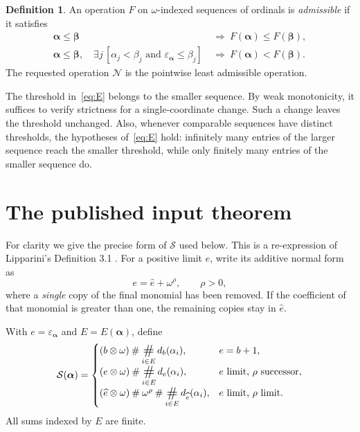 \documentclass[11pt,letterpaper]{article}
\theoremstyle{definition}
\newtheorem{definition}[theorem]{Definition}
\theoremstyle{remark}
\newcommand{\Nop}{\mathcal N}
\newcommand{\Sop}{\mathcal S}
\newcommand{\seq}[1]{\boldsymbol{#1}}
\newcommand{\ns}{\mathbin{\#}}
\newcommand{\np}{\mathbin{\otimes}}
\newcommand{\NS}{\mathop{\mathchoice{\vcenter{\hbox{\Large\#}}}{\vcenter{\hbox{\large\#}}}{\#}{\#}}}
\newcommand{\epsa}{\varepsilon_{\seq\alpha}}
\newcommand{\diff}[2]{d_{#1}(#2)}
\begin{document}
\begin{definition}\label{def:admissible}
An operation $F$ on $\omega$-indexed sequences of ordinals is \emph{admissible} if it satisfies
\begin{align}
 \seq\alpha\le\seq\beta&\ \Longrightarrow\ F(\seq\alpha)\le F(\seq\beta),\tag{M}\label{eq:M}\\
 \seq\alpha\le\seq\beta,\quad
 \exists j\,[\alpha_j<\beta_j\text{ and }\epsa\le\beta_j]
 &\ \Longrightarrow\ F(\seq\alpha)<F(\seq\beta).\tag{E}\label{eq:E}
\end{align}
The requested operation $\Nop$ is the pointwise least admissible operation.
\end{definition}

The threshold in~\eqref{eq:E} belongs to the smaller sequence. By weak monotonicity, it suffices to verify strictness for a single-coordinate change. Such a change leaves the threshold unchanged. Also, whenever comparable sequences have distinct thresholds, the hypotheses of~\eqref{eq:E} hold: infinitely many entries of the larger sequence reach the smaller threshold, while only finitely many entries of the smaller sequence do.

\section{The published input theorem}\label{sec:known}

For clarity we give the precise form of $\Sop$ used below. This is a re-expression of Lipparini's Definition 3.1 \cite{Lip26}. For a positive limit $e$, write its additive normal form as
\begin{equation}\label{eq:hat}
 e=\widehat e+\omega^\rho,\qquad \rho>0,
\end{equation}
where a \emph{single} copy of the final monomial has been removed. If the coefficient of that monomial is greater than one, the remaining copies stay in $\widehat e$.

With $e=\epsa$ and $E=E(\seq\alpha)$, define
\begin{equation}\label{eq:S-formula}
\Sop(\seq\alpha)=
\begin{cases}
 (b\np\omega)\ns\displaystyle\NS_{i\in E}\diff b{\alpha_i},
       & e=b+1,\\[4pt]
 (e\np\omega)\ns\displaystyle\NS_{i\in E}\diff e{\alpha_i},
       & e\text{ limit, }\rho\text{ successor},\\[4pt]
 (\widehat e\np\omega)\ns\omega^\rho
       \ns\displaystyle\NS_{i\in E}\diff{\widehat e}{\alpha_i},
       & e\text{ limit, }\rho\text{ limit}.
\end{cases}
\end{equation}
All sums indexed by $E$ are finite.
\end{document}

